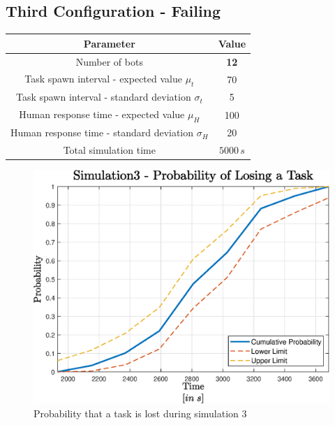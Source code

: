 \documentclass{article}
\begin{document}
		\subsection{Third Configuration - Failing}
			\label{sub:sim3}
			\begin{center}
				\begin{tabular}{ |c|c|}
					\hline
					Parameter & Value\\
					\hline
					\hline
					Number of bots & \textbf{12}\\
					\hline
					Task spawn interval - expected value $\mu_t$ & 70\\
					\hline					
					Task spawn interval - standard deviation $\sigma_t$ & 5\\
					\hline
					Human response time - expected value $\mu_H$ & 100\\
					\hline					
					Human response time - standard deviation $\sigma_H$ & 20\\
					\hline
					Total simulation time & $5000\,s$\\
					\hline
				\end{tabular}
			\end{center}
			\begin{figure}[H]
				\centering
					\includegraphics[scale = 0.7]{Images/Simulation3}
					\caption{Probability that a task is lost during simulation 3}
					\label{fig:sim3}
			\end{figure}
\end{document}
